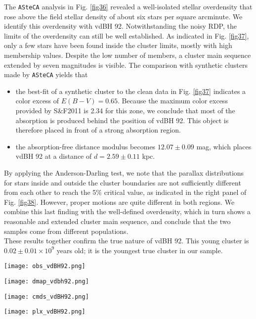 \documentclass[draft]{aa}
\begin{document}
The \texttt{ASteCA} analysis in Fig. \ref{fig36} revealed a
well-isolated stellar overdensity that rose above the field stellar density of
about six stars per square arcminute. We identify this overdensity with vdBH
92. Notwithstanding the noisy RDP, the limits of the overdensity can
still be well established. As indicated in Fig. \ref{fig37}, only a few stars
have been found inside the cluster limits, mostly with high membership values.
Despite the low number of members, a cluster main sequence extended by seven
magnitudes is visible. The comparison with synthetic clusters made by 
\texttt{ASteCA} yields that

\begin{itemize}
\item [a)] the best-fit of a synthetic cluster to the clean data in Fig. 
    \ref{fig37} indicates a color excess of $E(B-V)=0.65$. Because the
    maximum color excess provided by S\&F2011 is 2.34 for this zone, we
    conclude that most of the absorption is produced behind the position of
    vdBH 92. This object is therefore placed in front of a strong
    absorption region.
\item [b)] the absorption-free distance modulus becomes
$12.07\pm0.09$ mag, which places vdBH 92 at a distance of $d=2.59\pm0.11$ kpc.
\end{itemize}

By applying the Anderson-Darling test, we note that the parallax
distributions for stars inside and outside the cluster boundaries are not
sufficiently different from each other to reach the 5\% critical value, as
indicated in the right panel of Fig. \ref{fig38}. However, proper motions are
quite different in both regions. We combine this last finding with the well-defined overdensity, which in turn shows a reasonable and
extended cluster main sequence, and conclude that the two samples come from
different populations.\\

These results together confirm the true nature of vdBH 92. This
young cluster is $0.02\pm0.01\times10^9$ years old; it is the youngest true cluster
in our sample.

\begin{figure*}[ht]
    \centering
    \texttt{[image: obs\_vdBH92.png]}
    \caption{Idem Fig. \ref{fig:photom_vdBH85} for vdBH 92.}
    \label{fig35}
\end{figure*}
\begin{figure*}[ht]
    \centering
    \texttt{[image: dmap\_vdbh92.png]}
    \caption{Idem Fig. \ref{fig:struct_vdBH85} for vdBH 92.}
    \label{fig36}
\end{figure*}
\begin{figure*}[ht]
    \centering
    \texttt{[image: cmds\_vdBH92.png]}
    \caption{Idem Fig. \ref{fig:fundpars_vdBH85} for vdBH 92.}
    \label{fig37}
\end{figure*}
\begin{figure*}[ht]
    \centering
    \texttt{[image: plx\_vdBH92.png]}
    \caption{Idem Fig. \ref{fig:plx_bys_vdBH85} for vdBH 92.}
    \label{fig38}
\end{figure*}
\end{document}
